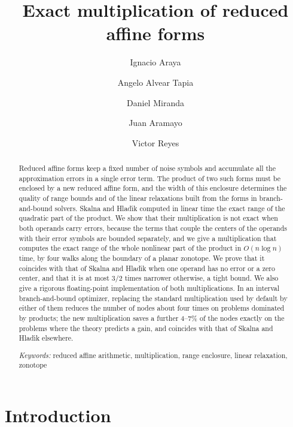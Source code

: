\documentclass[10pt]{article}
\title{Exact multiplication of reduced affine forms}
\author{Ignacio Araya \and Angelo Alvear Tapia \and Daniel Miranda \and Juan Aramayo \and Victor Reyes}
\date{\DIFaddbegin \small \DIFadd{Kindle version v3 (2026-11-21)}\DIFaddend }
\theoremstyle{definition}
\begin{document}
\maketitle

\begin{abstract}
Reduced affine forms keep a fixed number of noise symbols and accumulate all the approximation errors in a single error term. The product of two such forms must be enclosed by a new reduced affine form, and the width of this enclosure determines the quality of range bounds and of the linear relaxations built from the forms in branch-and-bound solvers. Skalna and Hlad\'{\i}k computed in linear time the exact range of the quadratic part of the product. We show that their multiplication is not exact when both operands carry errors, because the terms that couple the centers of the operands with their error symbols are bounded separately, and we give a multiplication that computes the exact range of the whole nonlinear part of the product in $O(n\log n)$ time, by four walks along the boundary of a planar zonotope. We prove that it coincides with that of Skalna and Hlad\'{\i}k when one operand has no error or a zero center, and that it is at most $3/2$ times narrower otherwise, a tight bound. We also give a rigorous floating-point implementation of both multiplications. In an interval branch-and-bound optimizer, replacing the standard multiplication used by default by either of them reduces the number of nodes about four times on problems dominated by products; the new multiplication saves a further 4--7\% of the nodes exactly on the problems where the theory predicts a gain, and coincides with that of Skalna and Hlad\'{\i}k elsewhere.

\medskip\noindent
\textit{Keywords:} reduced affine arithmetic, multiplication, range enclosure, linear relaxation, zonotope
\end{abstract}

\section{Introduction}
\end{document}

